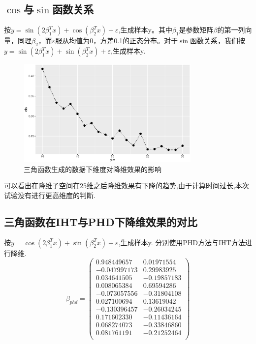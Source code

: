 \subsection{$\cos$与$\sin$函数关系}

按$y=\sin(2\beta_1^Tx)+\cos(\beta_2^Tx)+\varepsilon$,生成样本y。其中$\beta_1$是参数矩阵$\beta$的第一列向量，同理$\beta_2$，而$\varepsilon$服从均值为0，方差0.1的正态分布。对于$\sin$函数关系，我们按$y=\sin(2\beta_1^Tx)+\sin(\beta_2^Tx)+\varepsilon$,生成样本y.
\begin{figure}[H]
    \centering
    \includegraphics[width=0.8\textwidth]{image/cos_sin_iht.eps}
    \caption{三角函数生成的数据下维度对降维效果的影响}
\end{figure}
可以看出在降维子空间在25维之后降维效果有下降的趋势,由于计算时间过长,本次试验没有进行更高维度的判断.


\subsection{三角函数在IHT与PHD下降维效果的对比}
按$y=\cos(2\beta_1^Tx)+\sin(\beta_2^Tx)+\varepsilon$,生成样本y. 分别使用PHD方法与IHT方法进行降维.
\begin{equation}       %
    \beta_{phd}= \left(                 %
       \begin{array}{cc}   %
          0.948449657  &  0.01971554 \\
         -0.047997173  &  0.29983925 \\
          0.034641505  & -0.19857183 \\
          0.008065384  &  0.69594286 \\
         -0.073057556  & -0.31804108 \\
          0.027100694  &  0.13619042 \\
         -0.130396457  & -0.26034245 \\
          0.171602330  & -0.11436164 \\
          0.068274073  & -0.33846860 \\
          0.081761191  & -0.21252464 \\
       \end{array}
     \right)                 %
 \end{equation}


